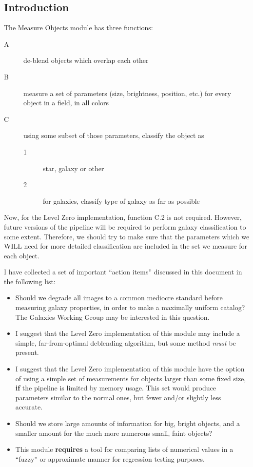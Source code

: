 
\subsection {Introduction}

  The Measure Objects module has three functions:

\begin {description}
\item [A] de-blend objects which overlap each other
\item [B] measure a set of parameters (size, brightness, position, etc.)
             for every object in a field, in all colors
\item [C] using some subset of those parameters, classify the object as
   \begin {description}
   \item [1] star, galaxy or other
   \item [2] for galaxies, classify type of galaxy as far as possible
   \end {description}
\end {description}

Now, for the Level Zero implementation, function C.2 is not required.
However, future versions of the pipeline will be required to perform
galaxy classification to some extent.  Therefore, we should try to 
make sure that the parameters which we WILL need for more detailed 
classification are included in the set we measure for each object.

  I have collected a set of important ``action items'' discussed in
this document in the following list:

\begin {itemize}
  \item Should we degrade all images to a common mediocre standard before
           measuring galaxy properties, in order to make a maximally
           uniform catalog?  The Galaxies Working Group may be
           interested in this question.
  \item I suggest that the Level Zero implementation of this module
           may include a simple, far-from-optimal deblending
           algorithm, but some method {\it must} be present.
  \item I suggest that the Level Zero implementation of this module
           have the option of using a simple set of measurements
           for objects larger than some fixed size, {\bf if} the pipeline
           is limited by memory usage.  This set would produce
           parameters similar to the normal ones, but fewer and/or
           slightly less accurate.
  \item Should we store large amounts of information for big, bright
           objects, and a smaller amount for the much more numerous
           small, faint objects?
  \item This module {\bf requires} a tool for comparing lists of 
           numerical values in a ``fuzzy'' or approximate manner
           for regression testing purposes.
\end {itemize}

